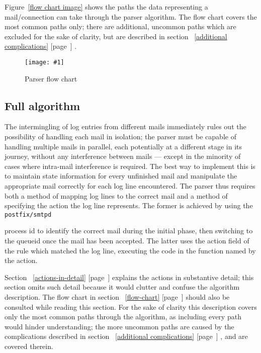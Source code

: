 \documentclass[a4paper,12pt,draft]{article}
\newcommand{\showgraph}[3]{
    \begin{figure}[hbt!]
        \caption{#2}\label{#3}
        \texttt{[image: \#1]}
    \end{figure}
}
\newcommand{\refwithpage}[1]{%
    \empty{}\ref{#1} [page~\pageref{#1}]%
}
\newcommand{\daemon}[1]{%
    \texttt{postfix/#1}%
}
\begin{document}
\label{flow-chart}

Figure~\ref{flow chart image} shows the paths the data representing a
mail/connection can take through the parser algorithm.  The flow chart
covers the most common paths only; there are additional, uncommon paths
which are excluded for the sake of clarity, but are described in
section~\refwithpage{additional complications}.

\showgraph{build/logparser-flow-chart.ps}{Parser flow chart}{flow chart
image}
\clearpage

\subsection{Full algorithm}

\label{full-algorithm}

The intermingling of log entries from different mails immediately rules out
the possibility of handling each mail in isolation; the parser must be
capable of handling multiple mails in parallel, each potentially at a
different stage in its journey, without any interference between mails ---
except in the minority of cases where intra-mail interference is required.
The best way to implement this is to maintain state information for every
unfinished mail and manipulate the appropriate mail correctly for each log
line encountered.  The parser thus requires both a method of mapping log
lines to the correct mail and a method of specifying the action the log
line represents.  The former is achieved by using the \daemon{smtpd}
process id to identify the correct mail during the initial phase, then
switching to the queueid once the mail has been accepted.  The latter uses
the action field of the rule which matched the log line, executing the code
in the function named by the action.

Section~\refwithpage{actions-in-detail} explains the actions in substantive
detail; this section omits such detail because it would clutter and confuse
the algorithm description.  The flow chart in
section~\refwithpage{flow-chart} should also be consulted while reading
this section.  For the sake of clarity this description covers only the
most common paths through the algorithm, as including every path would
hinder understanding; the more uncommon paths are caused by the
complications described in section~\refwithpage{additional complications},
and are covered therein.
\end{document}
